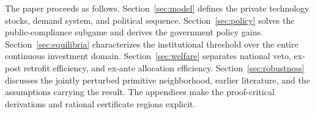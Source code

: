 The paper proceeds as follows. Section~\ref{sec:model} defines the private technology stocks, demand system, and political sequence. Section~\ref{sec:policy} solves the public-compliance subgame and derives the government policy gains. Section~\ref{sec:equilibria} characterizes the institutional threshold over the entire continuous investment domain. Section~\ref{sec:welfare} separates national veto, ex-post retrofit efficiency, and ex-ante allocation efficiency. Section~\ref{sec:robustness} discusses the jointly perturbed primitive neighborhood, earlier literature, and the assumptions carrying the result. The appendices make the proof-critical derivations and rational certificate regions explicit.
